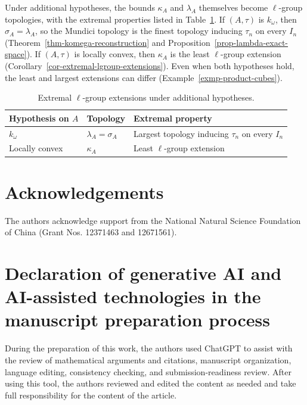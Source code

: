 \documentclass[preprint,3p]{elsarticle}
\theoremstyle{plain}
\theoremstyle{definition}
\numberwithin{equation}{section}
\begin{document}
Under additional hypotheses, the bounds $\kappa_A$ and $\lambda_A$
themselves become $\ell$-group topologies, with the extremal properties
listed in Table~\ref{tab-extremal-extensions}.
If $(A,\tau)$ is $k_\omega$, then $\sigma_A=\lambda_A$,
so the Mundici topology is the finest topology inducing
$\tau_n$ on every $I_n$
(Theorem~\ref{thm-komega-reconstruction} and
Proposition~\ref{prop-lambda-exact-space}).
If $(A,\tau)$ is locally convex, then $\kappa_A$ is the least
$\ell$-group extension
(Corollary~\ref{cor-extremal-lgroup-extensions}).
Even when both hypotheses hold, the least and largest extensions
can differ (Example~\ref{exmp-product-cubes}).

\begin{table}[!htb]
\centering
\small
\renewcommand{\arraystretch}{1.25}
\begin{tabular}{@{}>{\raggedright\arraybackslash}p{}
                  >{\raggedright\arraybackslash}p{}
                  >{\raggedright\arraybackslash}p{}@{}}
\hline
Hypothesis on $A$ & Topology & Extremal property\\
\hline
$k_\omega$ & $\lambda_A=\sigma_A$ &
Largest topology inducing $\tau_n$ on every $I_n$\\
Locally convex & $\kappa_A$ &
Least $\ell$-group extension\\
\hline
\end{tabular}
\caption{Extremal $\ell$-group extensions under additional hypotheses.}
\label{tab-extremal-extensions}
\end{table}

\section*{Acknowledgements}

The authors acknowledge support from the National Natural Science
Foundation of China (Grant Nos. 12371463 and 12671561).

\section*{Declaration of generative AI and AI-assisted technologies
in the manuscript preparation process}

During the preparation of this work, the authors used ChatGPT to assist with 
the review of mathematical arguments and citations, manuscript organization, 
language editing, consistency checking, and submission-readiness review. 
After using this tool, the authors reviewed and edited the content as needed 
and take full responsibility for the content of the article.



\end{document}
